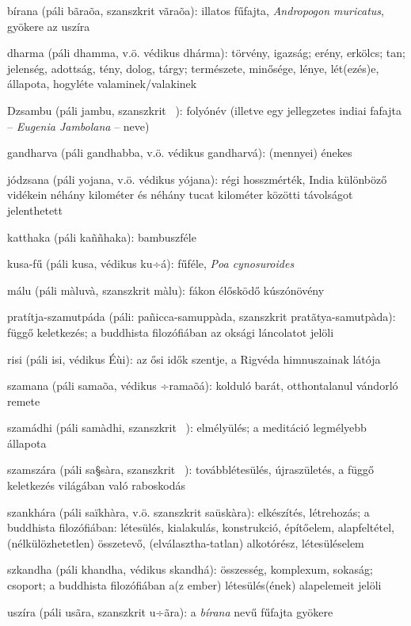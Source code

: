 
bírana (páli bãraõa, szanszkrit vãraõa): illatos fűfajta, \textit{Andropogon muricatus}, gyökere az uszíra

dharma (páli dhamma, v.ö. védikus dhárma): törvény, igazság; erény, erkölcs; tan; jelenség, adottság, tény, dolog, tárgy; természete, minősége, lénye, lét(ezés)e, állapota, hogyléte valaminek/valakinek

Dzsambu (páli jambu, szanszkrit ~): folyónév (illetve egy jellegzetes indiai fafajta – \textit{Eugenia Jambolana} – neve) 

gandharva (páli gandhabba, v.ö. védikus gandharvá): (mennyei) énekes

jódzsana (páli yojana, v.ö. védikus yójana): régi hosszmérték, India különböző vidékein néhány kilométer és néhány tucat kilométer közötti távolságot jelenthetett

katthaka (páli kaññhaka): bambuszféle

kusa-fű (páli kusa, védikus ku÷á): fűféle, \textit{Poa cynosuroides}

málu (páli màluvà, szanszkrit màlu): fákon élősködő kúszónövény

pratítja-szamutpáda (páli: pañicca-samuppàda, szanszkrit pratãtya-samutpàda): függő keletkezés; a buddhista filozófiában az oksági láncolatot jelöli

risi (páli isi, védikus\textit{ }Éùi): az ősi idők szentje, a Rigvéda himnuszainak látója

szamana (páli samaõa, védikus\textit{ }÷ramaõá): kolduló barát, otthontalanul vándorló remete

szamádhi (páli samàdhi, szanszkrit ~): elmélyülés; a meditáció legmélyebb állapota

szamszára (páli sa§sàra, szanszkrit ~): továbblétesülés, újraszületés, a függő keletkezés világában való raboskodás

szankhára (páli saïkhàra, v.ö. szanszkrit saüskàra): elkészítés, létrehozás; a buddhista filozófiában: létesülés, kialakulás, konstrukció, építőelem, alapfeltétel, (nélkülözhetetlen) összetevő, (elválasztha-tatlan) alkotórész, létesüléselem

szkandha (páli khandha, védikus skandhá): összesség, komplexum, sokaság; csoport; a buddhista filozófiában a(z ember) létesülés(ének) alapelemeit jelöli

uszíra (páli usãra, szanszkrit u÷ãra): a \textit{bírana} nevű fűfajta gyökere
